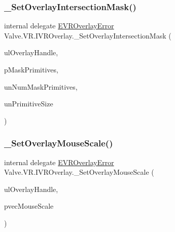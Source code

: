 \subsubsection{\texorpdfstring{\_SetOverlayIntersectionMask()}{\_SetOverlayIntersectionMask()}}
{\footnotesize\ttfamily internal delegate \mbox{\hyperlink{namespace_valve_1_1_v_r_aaee5c5144f42b7969d45b854f51b0c18}{E\+V\+R\+Overlay\+Error}} Valve.\+V\+R.\+I\+V\+R\+Overlay.\+\_\+\+Set\+Overlay\+Intersection\+Mask (\begin{DoxyParamCaption}\item[{ulong}]{ul\+Overlay\+Handle,  }\item[{ref \mbox{\hyperlink{struct_valve_1_1_v_r_1_1_v_r_overlay_intersection_mask_primitive__t}{V\+R\+Overlay\+Intersection\+Mask\+Primitive\+\_\+t}}}]{p\+Mask\+Primitives,  }\item[{uint}]{un\+Num\+Mask\+Primitives,  }\item[{uint}]{un\+Primitive\+Size }\end{DoxyParamCaption})}

\mbox{\label{struct_valve_1_1_v_r_1_1_i_v_r_overlay_a754c67b5ba2654c82e4f4e066d87af9f}} 
\subsubsection{\texorpdfstring{\_SetOverlayMouseScale()}{\_SetOverlayMouseScale()}}
{\footnotesize\ttfamily internal delegate \mbox{\hyperlink{namespace_valve_1_1_v_r_aaee5c5144f42b7969d45b854f51b0c18}{E\+V\+R\+Overlay\+Error}} Valve.\+V\+R.\+I\+V\+R\+Overlay.\+\_\+\+Set\+Overlay\+Mouse\+Scale (\begin{DoxyParamCaption}\item[{ulong}]{ul\+Overlay\+Handle,  }\item[{ref \mbox{\hyperlink{struct_valve_1_1_v_r_1_1_hmd_vector2__t}{Hmd\+Vector2\+\_\+t}}}]{pvec\+Mouse\+Scale }\end{DoxyParamCaption})}

\mbox{\label{struct_valve_1_1_v_r_1_1_i_v_r_overlay_a465fcf8a1450d69d7e1e4f26117069fe}} 
